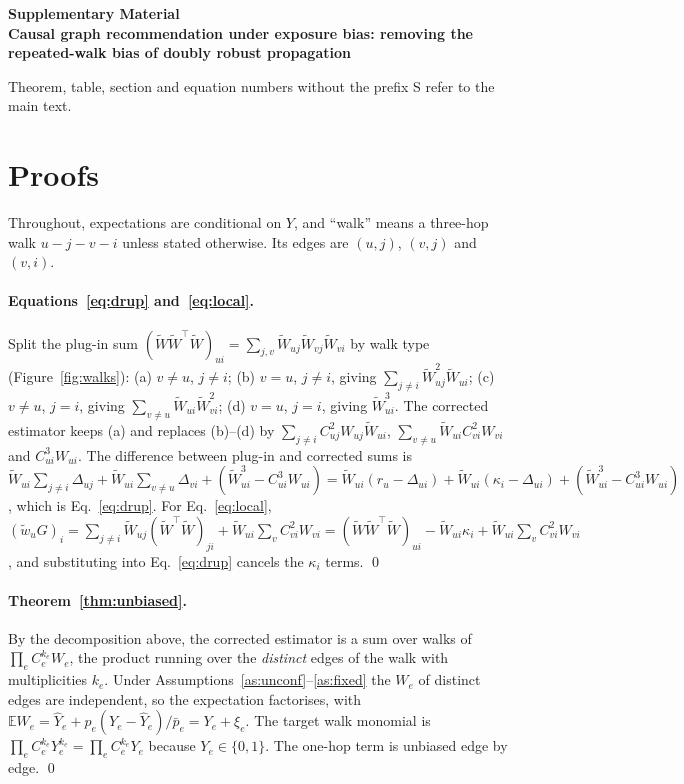 \documentclass[preprint,review,12pt,authoryear]{elsarticle}
\theoremstyle{definition}
\newcommand{\E}{\mathbb{E}}
\newcommand{\tW}{\tilde W}
\begin{document}
\begin{center}{\large\bfseries Supplementary Material\\[2pt]
Causal graph recommendation under exposure bias: removing the repeated-walk bias of doubly robust propagation}\end{center}

Theorem, table, section and equation numbers without the prefix S refer to the
main text.


\section{Proofs}\label{app:proofs}

Throughout, expectations are conditional on $Y$, and ``walk'' means a
three-hop walk $u\!-\!j\!-\!v\!-\!i$ unless stated otherwise. Its edges are
$(u,j)$, $(v,j)$ and $(v,i)$.

\paragraph{Equations~\eqref{eq:drup} and~\eqref{eq:local}.}
Split the plug-in sum $(\tW\tW^\top\tW)_{ui}=\sum_{j,v}\tW_{uj}\tW_{vj}\tW_{vi}$ by walk
type (Figure~\ref{fig:walks}): (a) $v\ne u$, $j\ne i$; (b) $v=u$, $j\ne i$, giving
$\sum_{j\ne i}\tW_{uj}^2\tW_{ui}$; (c) $v\ne u$, $j=i$, giving
$\sum_{v\ne u}\tW_{ui}\tW_{vi}^2$; (d) $v=u$, $j=i$, giving $\tW_{ui}^3$. The
corrected estimator keeps (a) and replaces (b)--(d) by
$\sum_{j\ne i}C_{uj}^2W_{uj}\tW_{ui}$, $\sum_{v\ne u}\tW_{ui}C_{vi}^2W_{vi}$ and
$C_{ui}^3W_{ui}$. The difference between plug-in and corrected sums is
$\tW_{ui}\sum_{j\ne i}\Delta_{uj}+\tW_{ui}\sum_{v\ne u}\Delta_{vi}+(\tW_{ui}^3-C_{ui}^3W_{ui})
=\tW_{ui}(r_u-\Delta_{ui})+\tW_{ui}(\kappa_i-\Delta_{ui})+(\tW_{ui}^3-C_{ui}^3W_{ui})$,
which is Eq.~\eqref{eq:drup}. For Eq.~\eqref{eq:local},
$(\tilde w_uG)_i=\sum_{j\ne i}\tW_{uj}(\tW^\top\tW)_{ji}+\tW_{ui}\sum_vC_{vi}^2W_{vi}
=(\tW\tW^\top\tW)_{ui}-\tW_{ui}\kappa_i+\tW_{ui}\sum_vC_{vi}^2W_{vi}$, and substituting
into Eq.~\eqref{eq:drup} cancels the $\kappa_i$ terms. \qed

\paragraph{Theorem~\ref{thm:unbiased}.}
By the decomposition above, the corrected estimator is a sum over walks of
$\prod_{e}C_e^{k_e}W_e$, the product running over the \emph{distinct} edges of the
walk with multiplicities $k_e$. Under Assumptions~\ref{as:unconf}--\ref{as:fixed}
the $W_e$ of distinct edges are independent, so the expectation factorises,
with $\E W_e=\hat Y_e+p_e(Y_e-\hat Y_e)/\bar p_e=Y_e+\xi_e$. The target walk
monomial is $\prod_eC_e^{k_e}Y_e^{k_e}=\prod_eC_e^{k_e}Y_e$ because
$Y_e\in\{0,1\}$. The one-hop term is unbiased edge by edge. \qed
\end{document}

